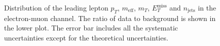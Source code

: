 \begin{figure}[htbp]
\begin{center}
\end{center}
\caption{Distribution of the  leading lepton $p_T$, $m_{\text{eff}}$, $m_T$, $E_{T}^{\text{miss}}$ and $n_{\text{jets}}$ in the electron-muon channel. The ratio of data to background is shown in the lower plot. The error bar includes all the systematic uncertainties except for the theoretical uncertainties.}
\label{fig:VRSS_fake_emu}
\end{figure}
